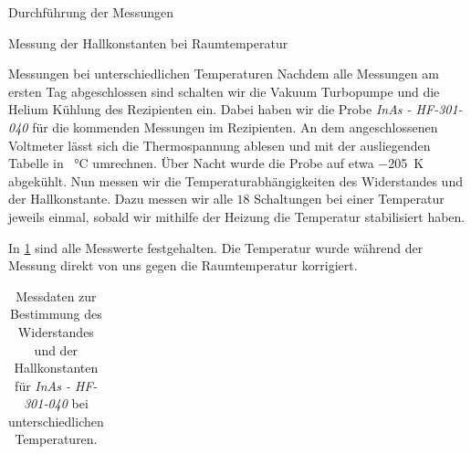 \documentclass[pdftex, a4paper,11pt, twoside, ngerman]{report}
\begin{document}
\begin{chapter}{Durchführung der Messungen}
\begin{section}{Messung der Hallkonstanten bei Raumtemperatur}
      
    \end{section}
    
    
    
    \begin{section}{Messungen bei unterschiedlichen Temperaturen}
      \label{chp:MessungUnterschiedlicheTemperaturen}
      Nachdem alle Messungen am ersten Tag abgeschlossen sind schalten wir die
      Vakuum Turbopumpe und die Helium Kühlung des Rezipienten ein.
      Dabei haben wir die Probe \textit{InAs - HF-301-040} für die kommenden
      Messungen im Rezipienten.
      An dem angeschlossenen Voltmeter lässt sich die Thermospannung ablesen
      und mit der ausliegenden Tabelle in \SI{}{\celsius} umrechnen.
      Über Nacht wurde die Probe auf etwa \SI{-205}{\kelvin} abgekühlt.
      Nun messen wir die Temperaturabhängigkeiten des Widerstandes und der
      Hallkonstante. Dazu messen wir alle $18$ Schaltungen bei einer Temperatur
      jeweils einmal, sobald wir mithilfe der Heizung die Temperatur
      stabilisiert haben.
      
      In \cref{tab:TemperaturInAs} sind alle Messwerte
      festgehalten. Die Temperatur wurde während der Messung direkt von
      uns gegen die Raumtemperatur korrigiert.
      \begin{table}
        \centering
        \footnotesize
        \begin{tabular}{c c c c c c c c c c c c c c c}
          
        \end{tabular}
        \caption{Messdaten zur Bestimmung des Widerstandes und der 
            Hallkonstanten für \textit{InAs - HF-301-040} bei
            unterschiedlichen Temperaturen.}
        \label{tab:TemperaturInAs}
      \end{table}
      
      
    \end{section}
   
    
    
  \end{chapter}
  
  
  
\end{document}
